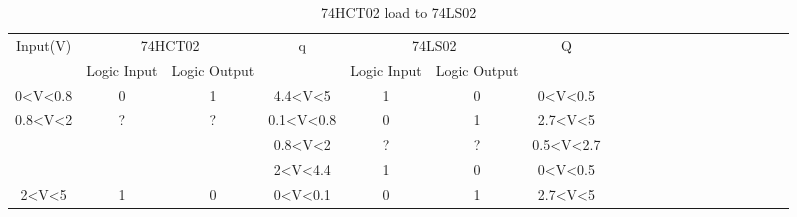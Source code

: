 	\begin{center}
	\hspace{1cm}\begin{table}[h!]
	\begin{tabular}{llllllllllllllllllll}
	\cline{1-7}
	\multicolumn{1}{|c|}{\multirow{2}{*}{Input(V)}} & \multicolumn{2}{c|}{74HCT02} & \multicolumn{1}{c|}{\multirow{2}{*}{q}} & \multicolumn{2}{c|}{74LS02} & \multicolumn{1}{c|}{\multirow{2}{*}{Q}}  \\ \cline{2-3} \cline{5-6}
	\multicolumn{1}{|c|}{} & \multicolumn{1}{c|}{Logic Input} & \multicolumn{1}{c|}{Logic Output} & \multicolumn{1}{c|}{} & \multicolumn{1}{c|}{Logic Input} & \multicolumn{1}{c|}{Logic Output} & \multicolumn{1}{c|}{}  \\ \cline{1-7}
	\multicolumn{1}{|c|}{0\textless{}V\textless{}0.8} & \multicolumn{1}{c|}{0} & \multicolumn{1}{c|}{1} & \multicolumn{1}{c|}{4.4\textless{}V\textless{}5} & \multicolumn{1}{c|}{1} & \multicolumn{1}{c|}{0} & \multicolumn{1}{c|}{0\textless{}V\textless{}0.5}  \\ \cline{1-7}
	\multicolumn{1}{|c|}{\multirow{3}{*}{0.8\textless{}V\textless{}2}} & \multicolumn{1}{c|}{\multirow{3}{*}{?}} & \multicolumn{1}{c|}{\multirow{3}{*}{?}} & \multicolumn{1}{c|}{0.1\textless{}V\textless{}0.8} & \multicolumn{1}{c|}{0} & \multicolumn{1}{c|}{1} & \multicolumn{1}{c|}{2.7\textless{}V\textless{}5}  \\ \cline{4-7}
	\multicolumn{1}{|c|}{} & \multicolumn{1}{c|}{} & \multicolumn{1}{c|}{} & \multicolumn{1}{c|}{0.8\textless{}V\textless{}2} & \multicolumn{1}{c|}{?} & \multicolumn{1}{c|}{?} & \multicolumn{1}{c|}{0.5\textless{}V\textless{}2.7}  \\ \cline{4-7}
	\multicolumn{1}{|c|}{} & \multicolumn{1}{c|}{} & \multicolumn{1}{c|}{} & \multicolumn{1}{c|}{2\textless{}V\textless{}4.4} & \multicolumn{1}{c|}{1} & \multicolumn{1}{c|}{0} & \multicolumn{1}{c|}{0\textless{}V\textless{}0.5}  \\ \cline{1-7}
	\multicolumn{1}{|c|}{2\textless{}V\textless{}5} & \multicolumn{1}{c|}{1} & \multicolumn{1}{c|}{0} & \multicolumn{1}{c|}{0\textless{}V\textless{}0.1} & \multicolumn{1}{c|}{0} & \multicolumn{1}{c|}{1} & \multicolumn{1}{c|}{2.7\textless{}V\textless{}5}\\ \cline{1-7}
	\end{tabular}
	\caption{\color{cyan}74HCT02 load to 74LS02}
	\label{fig:ej2thhcttols}
	\end{table}
	\end{center}
	

